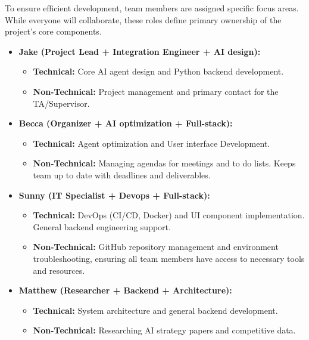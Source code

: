 \documentclass{article}
\begin{document}
To ensure efficient development, team members are assigned specific focus areas. While everyone will collaborate, these roles define primary ownership of the project’s core components.

\begin{itemize}
  \item \textbf{Jake (Project Lead + Integration Engineer + AI design):} 
    \begin{itemize}
        \item \textbf{Technical:} Core AI agent design and Python backend development.
        \item \textbf{Non-Technical:} Project management and primary contact for the TA/Supervisor.
    \end{itemize}
    
  \item \textbf{Becca (Organizer + AI optimization + Full-stack):} 
    \begin{itemize}
        \item \textbf{Technical:} Agent optimization and User interface Development.
        \item \textbf{Non-Technical:} Managing agendas for meetings and to do lists. Keeps team up to date with deadlines and deliverables.
    \end{itemize}

  \item \textbf{Sunny (IT Specialist + Devops + Full-stack):} 
    \begin{itemize}
        \item \textbf{Technical:} DevOps (CI/CD, Docker) and UI component implementation. General backend engineering support.
        \item \textbf{Non-Technical:} GitHub repository management and environment troubleshooting, ensuring all team members have access to necessary tools and resources.
    \end{itemize}

  \item \textbf{Matthew (Researcher + Backend + Architecture):} 
    \begin{itemize}
        \item \textbf{Technical:} System architecture and general backend development.
        \item \textbf{Non-Technical:} Researching AI strategy papers and competitive data.
    \end{itemize}
\end{itemize}
\end{document}
